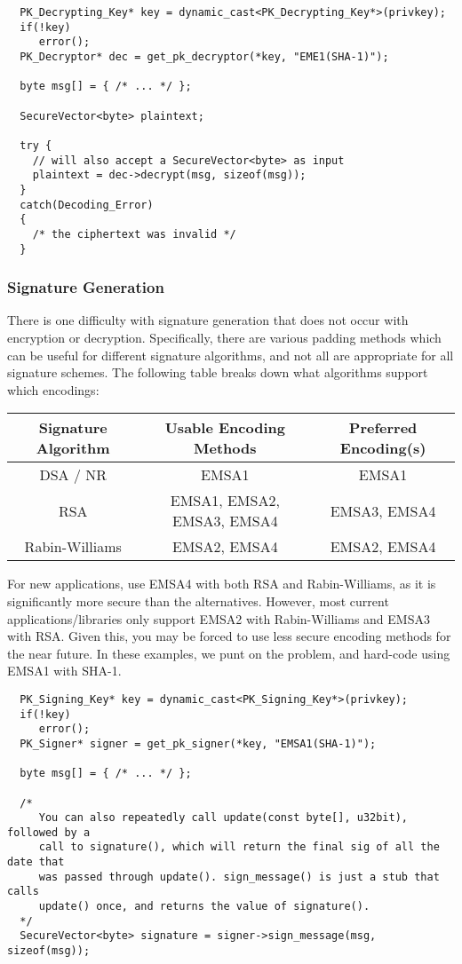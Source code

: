 \documentclass{article}
\begin{document}
\begin{verbatim}
  PK_Decrypting_Key* key = dynamic_cast<PK_Decrypting_Key*>(privkey);
  if(!key)
     error();
  PK_Decryptor* dec = get_pk_decryptor(*key, "EME1(SHA-1)");

  byte msg[] = { /* ... */ };

  SecureVector<byte> plaintext;

  try {
    // will also accept a SecureVector<byte> as input
    plaintext = dec->decrypt(msg, sizeof(msg));
  }
  catch(Decoding_Error)
  {
    /* the ciphertext was invalid */
  }
\end{verbatim}

\subsubsection{Signature Generation}

There is one difficulty with signature generation that does not occur with
encryption or decryption. Specifically, there are various padding methods which
can be useful for different signature algorithms, and not all are appropriate
for all signature schemes. The following table breaks down what algorithms
support which encodings:

\begin{tabular}{|c|c|c|} \hline
Signature Algorithm & Usable Encoding Methods & Preferred Encoding(s) \\ \hline
DSA / NR            & EMSA1                   & EMSA1 \\ \hline
RSA                 & EMSA1, EMSA2, EMSA3, EMSA4 & EMSA3, EMSA4 \\ \hline
Rabin-Williams      & EMSA2, EMSA4            & EMSA2, EMSA4 \\ \hline
\end{tabular}

For new applications, use EMSA4 with both RSA and Rabin-Williams, as it is
significantly more secure than the alternatives. However, most current
applications/libraries only support EMSA2 with Rabin-Williams and EMSA3 with
RSA. Given this, you may be forced to use less secure encoding methods for the
near future. In these examples, we punt on the problem, and hard-code using
EMSA1 with SHA-1.

\begin{verbatim}
  PK_Signing_Key* key = dynamic_cast<PK_Signing_Key*>(privkey);
  if(!key)
     error();
  PK_Signer* signer = get_pk_signer(*key, "EMSA1(SHA-1)");

  byte msg[] = { /* ... */ };

  /*
     You can also repeatedly call update(const byte[], u32bit), followed by a
     call to signature(), which will return the final sig of all the date that
     was passed through update(). sign_message() is just a stub that calls
     update() once, and returns the value of signature().
  */
  SecureVector<byte> signature = signer->sign_message(msg, sizeof(msg));
\end{verbatim}
\end{document}
